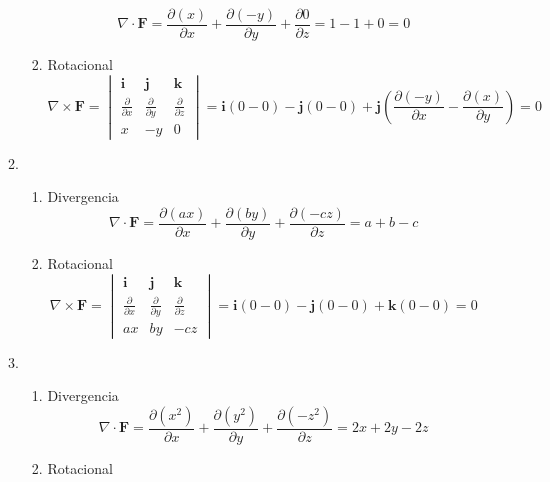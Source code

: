 \begin{enumerate}[label=\color{red}\textbf{\arabic*)}]
\begin{enumerate}[label=\color{red}\textbf{\alph*)}]
\begin{enumerate}[label=\arabic*)]
            \[
            \nabla \cdot \mathbf{F} =\frac{\partial (x)}{\partial x} +\frac{\partial (-y)}{\partial y} +\frac{\partial 0}{\partial z} =1-1+0=0
            \] 
          \item Rotacional
            \[
            \nabla \times \mathbf{F} =\begin{vmatrix} 
              \mathbf{i} & \mathbf{j}  & \mathbf{k} \\
              \frac{\partial }{\partial x} & \frac{\partial }{\partial y} & \frac{\partial }{\partial z} \\
              x & -y & 0
          \end{vmatrix}=\mathbf{i} (0-0)-\mathbf{j} (0-0)+\mathbf{j} \left( \frac{\partial (-y)}{\partial x} -\frac{\partial (x)}{\partial y}  \right) = 0
            \] 
        \end{enumerate}
      \item {} 
      \begin{enumerate}[label=\arabic*)]
                \item Divergencia
                  \[
                  \nabla \cdot \mathbf{F} =\frac{\partial (ax)}{\partial x} +\frac{\partial (by)}{\partial y} +\frac{\partial (-cz)}{\partial z} =a+b-c
                  \] 
                \item Rotacional
                  \[
                  \nabla \times \mathbf{F} =\begin{vmatrix} 
                    \mathbf{i}  & \mathbf{j} & \mathbf{k} \\
                    \frac{\partial }{\partial x} & \frac{\partial }{\partial y} & \frac{\partial }{\partial z} \\
                    ax & by & -cz
                  \end{vmatrix}=\mathbf{i} (0-0)-\mathbf{j} (0-0)+\mathbf{k} (0-0)=0 
                  \] 
              \end{enumerate}
      \item {} 
      \begin{enumerate}[label=\arabic*)]
                \item Divergencia
                  \[
                  \nabla \cdot \mathbf{F} =\frac{\partial (x^2)}{\partial x}+\frac{\partial (y^2)}{\partial y} +\frac{\partial (-z^2)}{\partial z}=2x+2y-2z
                  \] 
                \item Rotacional

\end{enumerate}
\end{enumerate}
\end{enumerate}
